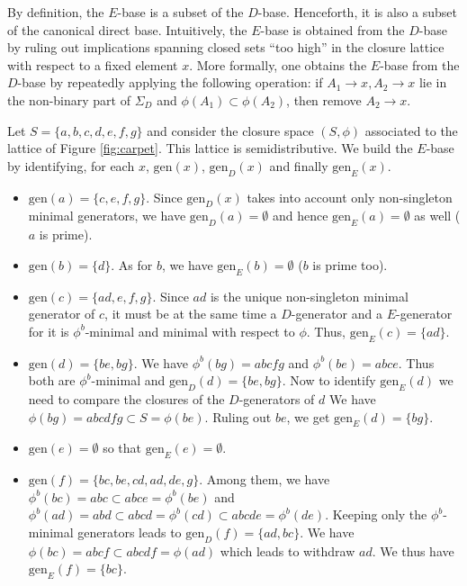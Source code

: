 \documentclass[12pt, a4paper]{article}
\newcommand{\U}{S}  %
\newcommand{\cl}{\phi}  %
\newcommand{\gen}{\mathrm{gen}}  %
\newcommand{\imp}{\rightarrow}  %
\newcommand{\is}{\Sigma}  %
\newcommand{\ka}[1]{\textcolor{magenta}{KA: \em #1}}
\begin{document}
By definition, the $E$-base is a subset of the $D$-base.
Henceforth, it is also a subset of the canonical direct base.
Intuitively, the $E$-base is obtained from the $D$-base by ruling out implications spanning closed sets ``too high'' in the closure lattice with respect to a fixed element $x$.
More formally, one obtains the $E$-base from the $D$-base by repeatedly applying the following operation: if $A_1 \imp x, A_2 \imp x$ lie in the non-binary part of $\is_D$ and $\cl(A_1) \subset \cl(A_2)$, then remove $A_2 \imp x$.
%
\begin{example} \label{ex:carpet}
Let $\U = \{a, b, c, d, e, f, g\}$ and consider the closure space $(\U, \cl)$ associated to the lattice of Figure \ref{fig:carpet}.
This lattice is semidistributive.
We build the $E$-base by identifying, for each $x$, $\gen(x)$, $\gen_D(x)$ and finally $\gen_E(x)$. 
\begin{itemize}
    \item $\gen(a) = \{c, e, f, g\}$. 
    Since $\gen_D(x)$ takes into account only non-singleton minimal generators, we have $\gen_D(a) = \emptyset$ and hence $\gen_E(a) = \emptyset$ as well ($a$ is prime). 
    
    \item $\gen(b) = \{d\}$.
    As for $b$, we have $\gen_E(b) = \emptyset$ ($b$ is prime too).
    
    \item $\gen(c) = \{ad, e, f, g\}$.
    Since $ad$ is the unique non-singleton minimal generator of $c$, it must be at the same time a $D$-generator and a $E$-generator for it is $\cl^b$-minimal and minimal with respect to $\cl$.
    Thus, $\gen_E(c) = \{ad\}$.
    
    \item $\gen(d) = \{be, bg\}$.
    We have $\cl^b(bg) = abc\!f\!g$ and $\cl^b(be) = abce$.
    Thus both are $\cl^b$-minimal and $\gen_D(d) = \{be, bg\}$.
    Now to identify $\gen_E(d)$ we need to compare the closures of the $D$-generators of $d$
    We have $\cl(bg) = abcd\!f\!g \subset \U = \cl(be)$. 
    Ruling out $be$, we get $\gen_E(d) = \{bg\}$.
    
    \item $\gen(e) = \emptyset$ so that $\gen_E(e) = \emptyset$. 
    
    \item $\gen(f) = \{bc, be, cd, ad, de, g\}$.
    Among them, we have $\cl^b(bc) = abc \subset abce = \cl^b(be)$ and $\cl^b(ad) = abd \subset abcd = \cl^b(cd) \subset abcde = \cl^b(de)$.
    Keeping only the $\cl^b$-minimal generators leads to $\gen_D(f) = \{ad, bc\}$.
    We have $\cl(bc) = abc\!f \subset abcdf = \cl(ad)$ which leads to withdraw $ad$.
    We thus have $\gen_E(f) = \{bc\}$.
    

\end{itemize}
\end{example}
\end{document}
